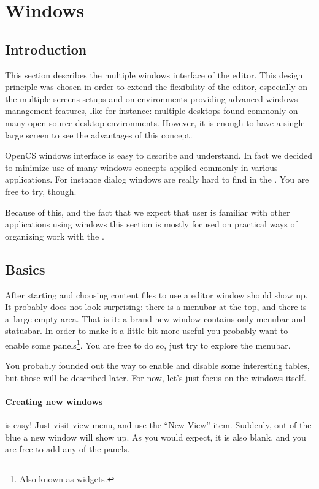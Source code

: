 \section{Windows}
\subsection{Introduction}
This section describes the multiple windows interface of the \OCS{} editor. This design principle was chosen in order
to extend the flexibility of the editor, especially on the multiple screens setups and on environments providing advanced
windows management features, like for instance: multiple desktops found commonly on many open source desktop environments.
However, it is enough to have a single large screen to see the advantages of this concept.

OpenCS windows interface is easy to describe and understand. In fact we decided to minimize use of many windows concepts
applied commonly in various applications. For instance dialog windows are really hard to find in the \OCS. You are free to try,
though.

Because of this, and the fact that we expect that user is familiar with other applications using windows this section is mostly
focused on practical ways of organizing work with the \OCS.

\subsection{Basics}
After starting \OCS{} and choosing content files to use a editor window should show up. It probably does not look surprising:
there is a menubar at the top, and there is a~large empty area. That is it: a brand new \OCS{} window contains only menubar
and statusbar. In order to make it a little bit more useful you probably want to enable some panels\footnote{Also known as widgets.}.
You are free to do so, just try to explore the menubar.

You probably founded out the way to enable and disable some interesting tables, but those will be described later. For now, let's
just focus on the windows itself.

\paragraph{Creating new windows}
is easy! Just visit view menu, and use the ``New View'' item. Suddenly, out of the blue a new window will show up. As you would expect,
it is also blank, and you are free to add any of the \OCS{} panels.

